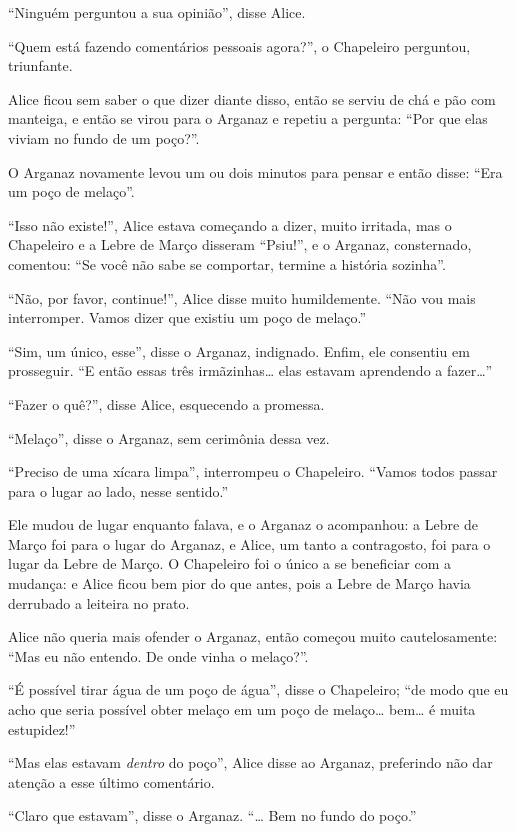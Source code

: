 ``Ninguém perguntou a sua opinião'', disse Alice.

``Quem está fazendo comentários pessoais agora?'', o Chapeleiro
perguntou, triunfante.

Alice ficou sem saber o que dizer diante disso, então se serviu de
chá e pão com manteiga, e então se virou para o Arganaz e repetiu a
pergunta: ``Por que elas viviam no fundo de um poço?''.

O Arganaz novamente levou um ou dois minutos para pensar e então disse:
``Era um poço de melaço''.

``Isso não existe!'', Alice estava começando a dizer, muito irritada,
mas o Chapeleiro e a Lebre de Março disseram ``Psiu!'', e o Arganaz,
consternado, comentou: ``Se você não sabe se comportar, termine a
história sozinha''.

``Não, por favor, continue!'', Alice disse muito humildemente. ``Não vou
mais interromper. Vamos dizer que existiu um poço de melaço.''

``Sim, um único, esse'', disse o Arganaz, indignado. Enfim, ele consentiu
em prosseguir. ``E então essas três irmãzinhas\ldots{} elas estavam
aprendendo a fazer\ldots{}''

``Fazer o quê?'', disse Alice, esquecendo a promessa.

``Melaço'', disse o Arganaz, sem cerimônia dessa vez.

``Preciso de uma xícara limpa'', interrompeu o Chapeleiro. ``Vamos todos
passar para o lugar ao lado, nesse sentido.''

Ele mudou de lugar enquanto falava, e o Arganaz o acompanhou: a Lebre de
Março foi para o lugar do Arganaz, e Alice, um tanto a contragosto, foi
para o lugar da Lebre de Março. O Chapeleiro foi o único a se beneficiar
com a mudança: e Alice ficou bem pior do que antes, pois a Lebre de
Março havia derrubado a leiteira no prato.

Alice não queria mais ofender o Arganaz, então começou muito
cautelosamente: ``Mas eu não entendo. De onde vinha o melaço?''.

``É possível tirar água de um poço de água'', disse o Chapeleiro; ``de
modo que eu acho que seria possível obter melaço em um poço de melaço\ldots{}
bem\ldots{} é muita estupidez!''

``Mas elas estavam \emph{dentro} do poço'', Alice disse ao Arganaz,
preferindo não dar atenção a esse último comentário.

``Claro que estavam'', disse o Arganaz. ``\ldots{} Bem no fundo do poço.''

